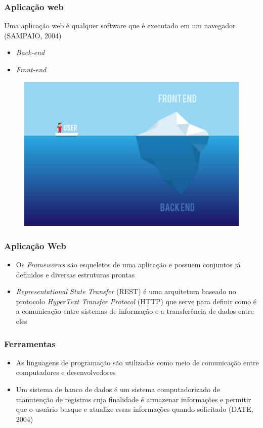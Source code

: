 \documentclass{beamer}
\begin{document}
	\begin{frame}\frametitle{Aplicação web}
		Uma aplicação web é qualquer software que é executado em um navegador (SAMPAIO, 2004)
		\begin{itemize}
			\item \textit{Back-end}
			\item \textit{Front-end}
		\end{itemize}
		\begin{figure}[ht]
			\centering
			\includegraphics[scale=.11]{img/front-back.jpg}
		\end{figure}
	\end{frame}

	\begin{frame}\frametitle{Aplicação Web}
		\begin{itemize}
			\item Os \textit{Frameworws} são esqueletos de uma aplicação e possuem conjuntos já definidos e diversas estruturas prontas
			\item \textit{Representational State Transfer} (REST) é uma arquitetura baseado no protocolo \textit{HyperText Transfer Protocol} (HTTP) que serve para definir como é a comunicação entre sistemas de informação e a transferência de dados entre eles
		\end{itemize}
	\end{frame}


	\begin{frame}\frametitle{Ferramentas}
		\begin{itemize}
			\item As linguagens de programação são utilizadas como meio de comunicação entre computadores e desenvolvedores
			\item Um sistema de banco de dados é um sistema computadorizado de manutenção de registros cuja finalidade é armazenar informações e permitir que o usuário busque e atualize essas informações quando solicitado (DATE, 2004)
		\end{itemize}
	\end{frame}
\end{document}
